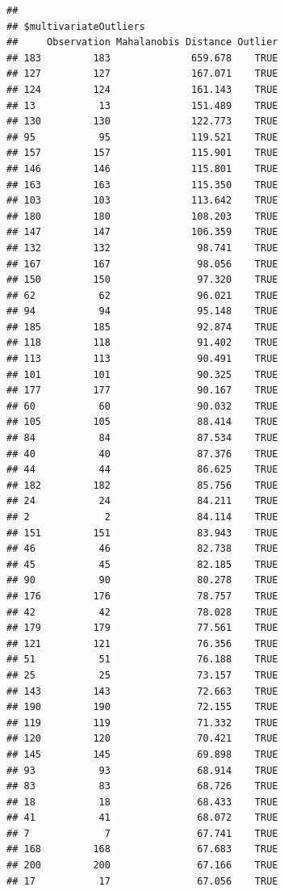 \documentclass{article}\usepackage[]{graphicx}\usepackage[]{color}
\makeatletter
\newenvironment{kframe}{%
 \def\at@end@of@kframe{}%
 \ifinner\ifhmode%
  \def\at@end@of@kframe{\end{minipage}}%
  \begin{minipage}{\columnwidth}%
 \fi\fi%
 \def\FrameCommand##1{\hskip\@totalleftmargin \hskip-\fboxsep
 \colorbox{shadecolor}{##1}\hskip-\fboxsep
     \hskip-\linewidth \hskip-\@totalleftmargin \hskip\columnwidth}%
 \MakeFramed {\advance\hsize-\width
   \@totalleftmargin\z@ \linewidth\hsize
   \@setminipage}}%
 {\par\unskip\endMakeFramed%
 \at@end@of@kframe}
\newenvironment{knitrout}{}{} %
\makeatother
\begin{document}
\begin{knitrout}
\begin{kframe}
\begin{verbatim}
## 
## $multivariateOutliers
##     Observation Mahalanobis Distance Outlier
## 183         183              659.678    TRUE
## 127         127              167.071    TRUE
## 124         124              161.143    TRUE
## 13           13              151.489    TRUE
## 130         130              122.773    TRUE
## 95           95              119.521    TRUE
## 157         157              115.901    TRUE
## 146         146              115.801    TRUE
## 163         163              115.350    TRUE
## 103         103              113.642    TRUE
## 180         180              108.203    TRUE
## 147         147              106.359    TRUE
## 132         132               98.741    TRUE
## 167         167               98.056    TRUE
## 150         150               97.320    TRUE
## 62           62               96.021    TRUE
## 94           94               95.148    TRUE
## 185         185               92.874    TRUE
## 118         118               91.402    TRUE
## 113         113               90.491    TRUE
## 101         101               90.325    TRUE
## 177         177               90.167    TRUE
## 60           60               90.032    TRUE
## 105         105               88.414    TRUE
## 84           84               87.534    TRUE
## 40           40               87.376    TRUE
## 44           44               86.625    TRUE
## 182         182               85.756    TRUE
## 24           24               84.211    TRUE
## 2             2               84.114    TRUE
## 151         151               83.943    TRUE
## 46           46               82.738    TRUE
## 45           45               82.185    TRUE
## 90           90               80.278    TRUE
## 176         176               78.757    TRUE
## 42           42               78.028    TRUE
## 179         179               77.561    TRUE
## 121         121               76.356    TRUE
## 51           51               76.188    TRUE
## 25           25               73.157    TRUE
## 143         143               72.663    TRUE
## 190         190               72.155    TRUE
## 119         119               71.332    TRUE
## 120         120               70.421    TRUE
## 145         145               69.898    TRUE
## 93           93               68.914    TRUE
## 83           83               68.726    TRUE
## 18           18               68.433    TRUE
## 41           41               68.072    TRUE
## 7             7               67.741    TRUE
## 168         168               67.683    TRUE
## 200         200               67.166    TRUE
## 17           17               67.056    TRUE

\end{verbatim}
\end{kframe}
\end{knitrout}
\end{document}
